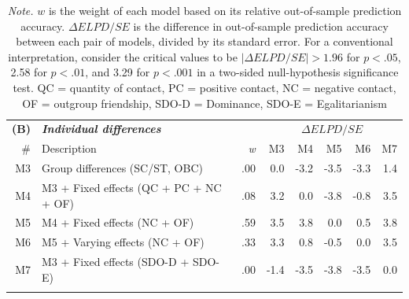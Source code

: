 \documentclass[12pt, a4paper]{article}
\begin{document}
\begin{table}
\begin{tabularx}{\linewidth}{rXrrrrrr} \toprule
\textbf{(B)} & \textit{\textbf{Individual differences}} & \multicolumn{1}{l}{} & \multicolumn{5}{c}{$\Delta\textit{ELPD}/\textit{SE}$}                                                                                    \\ \cmidrule{4-8}
\#           & Description                         & \textit{w}           & M3                          & M4                          & M5                          & M6                          & M7                         \\ \midrule
M3                               & Group differences (SC/ST, OBC)           & .00                  & {\color[HTML]{E0E0E0} 0.0}  & {\color[HTML]{D6604D} -3.2} & {\color[HTML]{B2182B} -3.5} & {\color[HTML]{B2182B} -3.3} & {\color[HTML]{E0E0E0} 1.4} \\
M4                               & M3 + Fixed effects (QC + PC + NC + OF)   & .08                  & {\color[HTML]{4393C3} 3.2}  & {\color[HTML]{E0E0E0} 0.0}  & {\color[HTML]{B2182B} -3.8} & {\color[HTML]{E0E0E0} -0.8} & {\color[HTML]{2166AC} 3.5} \\
M5                               & M4 + Fixed effects (NC + OF)             & .59                  & {\color[HTML]{2166AC} 3.5}  & {\color[HTML]{2166AC} 3.8}  & {\color[HTML]{E0E0E0} 0.0}  & {\color[HTML]{E0E0E0} 0.5}  & {\color[HTML]{2166AC} 3.8} \\
M6                               & M5 + Varying effects (NC + OF)           & .33                  & {\color[HTML]{2166AC} 3.3}  & {\color[HTML]{E0E0E0} 0.8}  & {\color[HTML]{E0E0E0} -0.5} & {\color[HTML]{E0E0E0} 0.0}  & {\color[HTML]{2166AC} 3.5} \\
M7                               & M3 + Fixed effects (SDO-D + SDO-E)       & .00                  & {\color[HTML]{E0E0E0} -1.4} & {\color[HTML]{B2182B} -3.5} & {\color[HTML]{B2182B} -3.8} & {\color[HTML]{B2182B} -3.5} & {\color[HTML]{E0E0E0} 0.0} \\ \bottomrule \addlinespace
\end{tabularx}
\label{tab:t2}
\caption*{\textit{Note.} $w$ is the weight of each model based on its relative out-of-sample prediction accuracy. $\Delta\textit{ELPD}/\textit{SE}$ is the difference in out-of-sample prediction accuracy between each pair of models, divided by its standard error. For a conventional interpretation, consider the critical values to be $|\Delta\textit{ELPD}/\textit{SE}| > 1.96$ for $p < .05$, 2.58 for $p < .01$, and 3.29 for $p < .001$ in a two-sided null-hypothesis significance test. QC = quantity of contact, PC = positive contact, NC = negative contact, OF = outgroup friendship, SDO-D = Dominance, SDO-E = Egalitarianism}
\end{table}
\end{document}
